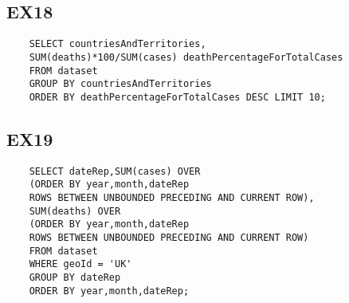 \documentclass[12pt]{extarticle}
\begin{document}
    \vspace{0.4cm}
    \subsection{EX18}
    \lstset{language=SQL}
    \begin{lstlisting}
    SELECT countriesAndTerritories,
    SUM(deaths)*100/SUM(cases) deathPercentageForTotalCases 
    FROM dataset
    GROUP BY countriesAndTerritories
    ORDER BY deathPercentageForTotalCases DESC LIMIT 10;
    \end{lstlisting}
    
    \vspace{0.4cm}
    \subsection{EX19}
    \lstset{language=SQL}
    \begin{lstlisting}
    SELECT dateRep,SUM(cases) OVER 
    (ORDER BY year,month,dateRep 
    ROWS BETWEEN UNBOUNDED PRECEDING AND CURRENT ROW),
    SUM(deaths) OVER 
    (ORDER BY year,month,dateRep 
    ROWS BETWEEN UNBOUNDED PRECEDING AND CURRENT ROW)
    FROM dataset
    WHERE geoId = 'UK'
    GROUP BY dateRep
    ORDER BY year,month,dateRep;
    \end{lstlisting}
\end{document}
